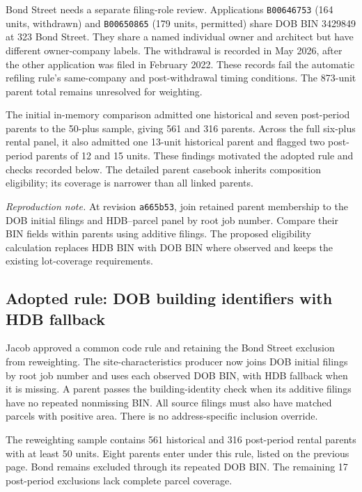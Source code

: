 Bond Street needs a separate filing-role review. Applications
\texttt{B00646753} (164 units, withdrawn) and \texttt{B00650865} (179 units,
permitted) share DOB BIN 3429849 at 323 Bond Street. They share a named
individual owner and architect but have different owner-company labels.
The withdrawal is recorded in May 2026, after the other application was filed
in February 2022. These records fail the automatic refiling rule's same-company
and post-withdrawal timing conditions. The 873-unit parent total remains
unresolved for weighting.

The initial in-memory comparison admitted one historical and seven post-period
parents to the 50-plus sample, giving 561 and 316 parents. Across the full
six-plus rental panel, it also admitted one 13-unit historical parent and
flagged two post-period parents of 12 and 15 units. These findings motivated
the adopted rule and checks recorded below. The detailed parent casebook
inherits composition eligibility; its coverage is narrower than all linked
parents.

\textit{Reproduction note.} At revision \texttt{a665b53}, join retained parent
membership to the DOB initial filings and HDB--parcel panel by root job number.
Compare their BIN fields within parents using additive filings. The proposed
eligibility calculation replaces HDB BIN with DOB BIN where observed and keeps
the existing lot-coverage requirements.

\clearpage
\subsection*{Adopted rule: DOB building identifiers with HDB fallback}

Jacob approved a common code rule and retaining the Bond Street exclusion from
reweighting. The site-characteristics producer now joins DOB initial filings
by root job number and uses each observed DOB BIN, with HDB fallback when it is
missing. A parent passes the building-identity check when its additive filings
have no repeated nonmissing BIN. All source filings must also have matched
parcels with positive area. There is no address-specific inclusion override.

The reweighting sample contains 561 historical and 316 post-period rental
parents with at least 50 units. Eight parents enter under this rule, listed on
the previous page. Bond remains excluded through its repeated DOB BIN. The
remaining 17 post-period exclusions lack complete parcel coverage.

